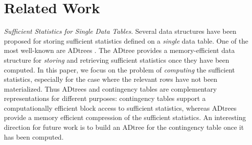 \documentclass{acm_proc_article-sp}
\begin{document}
\section{Related Work} 

{\em Sufficient Statistics for Single Data Tables.} Several data structures have been proposed for storing sufficient statistics defined on a {\em single} data table. 
One of the most well-known are ADtrees \cite{Moore1998}. 
The ADtree provides a memory-efficient data structure for {\em storing} and retrieving sufficient statistics once they have been computed. 
In this paper, we focus on the problem of {\em computing} the sufficient statistics, especially for the case where the relevant rows have not been materialized. 
Thus ADtrees and contingency tables are complementary representations for different purposes: contingency tables support a computationally efficient block access to sufficient statistics, whereas ADtrees provide a memory efficient compression of the sufficient statistics. 
An interesting direction for future work is to build an ADtree for the contingency table once it has been computed. 
%
\end{document}
